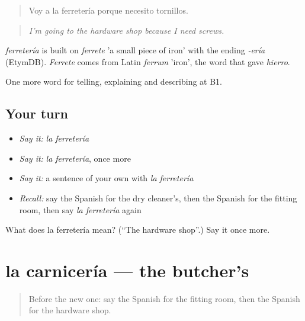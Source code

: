 \begin{quote}
Voy a la ferretería porque necesito tornillos.
\end{quote}

\begin{quote}
\emph{I'm going to the hardware shop because I need screws.}
\end{quote}

\begin{cousinweb}
\emph{ferretería} is built on \emph{ferrete} 'a small piece of iron' with the ending \emph{-ería} (EtymDB). \emph{Ferrete} comes from Latin \emph{ferrum} 'iron', the word that gave \emph{hierro}.
\end{cousinweb}

\begin{grammarlens}[title={What you've built}]
One more word for telling, explaining and describing at B1.
\end{grammarlens}

\subsection*{Your turn}
\begin{itemize}
\raggedright
  \item \emph{Say it:} \emph{la ferretería}
  \item \emph{Say it:} \emph{la ferretería}, once more
  \item \emph{Say it:} a sentence of your own with \emph{la ferretería}
  \item \emph{Recall:} say the Spanish for the dry cleaner's, then the Spanish for the fitting room, then say \emph{la ferretería} again
\end{itemize}

\begin{tcolorbox}[breakable,colback=teal!4,colframe=teal!35!black,title={Before you move on}]
What does la ferretería mean? (\textquotedblleft{}The hardware shop\textquotedblright{}.) Say it once more.
\end{tcolorbox}
\section[la carnicería]{la carnicería — the butcher's}

\label{lesson:ES-C770-carniceria}



\begin{quote}
Before the new one: say the Spanish for the fitting room, then the Spanish for the hardware shop.
\end{quote}


